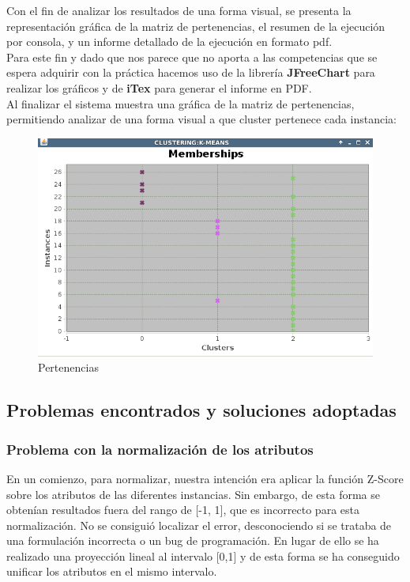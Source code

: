 \documentclass[10pt,a4paper]{article}
\begin{document}
Con el fin de analizar los resultados de una forma visual, se presenta la representación gráfica de la matriz de pertenencias, el resumen de la ejecución por consola, y un informe detallado de la ejecución en formato pdf.\\
 Para este fin y dado que nos parece que no aporta a las competencias que se espera adquirir con la práctica hacemos uso de la librería \textbf{JFreeChart} para realizar los gráficos y de \textbf{iTex} para generar el informe en PDF.\\
 Al finalizar el sistema muestra una gráfica de la matriz de pertenencias, permitiendo analizar de una forma visual a que cluster pertenece cada instancia:

\begin{figure}[H]
	\centering
	\includegraphics[scale=0.40]{./img/membership.png}%
	\caption[Gráfica Matriz de pertenencias]{Pertenencias}
	\label{fig:dependencias}
\end{figure}


\subsection{Problemas encontrados y soluciones adoptadas}


\subsubsection{Problema con la normalización de los atributos}

En un comienzo, para normalizar, nuestra intención era aplicar la función Z-Score sobre los atributos de las diferentes instancias. Sin embargo, de esta forma se 
obtenían resultados fuera del rango de [-1, 1], que es incorrecto para esta normalización. No se consiguió localizar el error, desconociendo si se trataba de una
 formulación incorrecta o un bug de programación. En lugar de ello se ha realizado una proyección lineal al intervalo [0,1] y de esta forma se ha conseguido unificar los atributos en el mismo intervalo.\\
\end{document}
